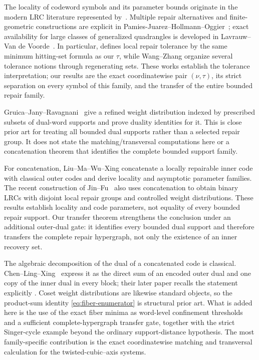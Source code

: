 \documentclass[11pt]{article}
\theoremstyle{definition}
\theoremstyle{remark}
\begin{document}
The locality of codeword symbols and its parameter bounds originate in the
modern LRC literature represented by~\cite{GopalanEtAl2012}.  Multiple
repair alternatives and finite-geometric constructions are explicit in
Pamies-Juarez--Hollmann--Oggier~\cite{PamiesEtAl2013}; exact availability for
large classes of generalized quadrangles is developed in
Lavrauw--Van de Voorde~\cite{LavrauwVanDeVoorde2019}.  In particular,
\cite[Definition~3]{PamiesEtAl2013} defines local repair tolerance by the
same minimum hitting-set formula as our $\tau$, while Wang--Zhang
\cite{WangZhang2014} organize several tolerance notions through regenerating
sets.  These works establish the tolerance interpretation; our results are
the exact coordinatewise pair $(\nu,\tau)$, its strict separation on every
symbol of this family, and the transfer of the entire bounded repair family.

Gruica--Jany--Ravagnani~\cite{GruicaEtAl2026} give a refined weight
distribution indexed by prescribed subsets of dual-word supports and prove
duality identities for it.  This is close prior art for treating all bounded
dual supports rather than a selected repair group.  It does not state the
matching/transversal computations here or a concatenation theorem that
identifies the complete bounded support family.

For concatenation, Liu--Ma--Wu--Xing
\cite[Theorem~3.1]{LiuEtAl2022} concatenate a locally repairable inner code
with classical outer codes and derive locality and asymptotic parameter
families.  The recent construction of Jin--Fu~\cite{JinFu2026} also uses
concatenation to obtain binary LRCs with disjoint local repair groups and
controlled weight distributions.  These results establish locality and code
parameters, not equality of every bounded repair support.  Our transfer
theorem strengthens the conclusion under an additional outer-dual gate: it
identifies every bounded dual support and therefore transfers the complete
repair hypergraph, not only the existence of an inner recovery set.

The algebraic decomposition of the dual of a concatenated code is classical.
Chen--Ling--Xing~\cite[Theorem~2.3]{ChenLingXing2001} express it as the direct
sum of an encoded outer dual and one copy of the inner dual in every block;
their later paper recalls the statement explicitly
\cite[Theorem~2.1]{ChenLingXing2005}.  Coset weight distributions are likewise
standard objects, so the product-sum identity
\eqref{eq:fiber-enumerator} is structural prior art.  What is added here is
the use of the exact fiber minima as word-level confinement thresholds and a
sufficient complete-hypergraph transfer gate, together with the strict
Singer-cycle example beyond the ordinary support-distance hypothesis.  The
most family-specific contribution is the exact coordinatewise matching and
transversal calculation for the twisted-cubic--axis systems.
\end{document}
